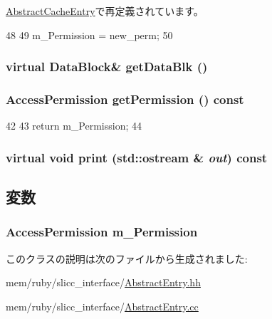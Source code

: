 \hyperlink{classAbstractCacheEntry_ac3f081af818286da737aac954875dd19}{AbstractCacheEntry}で再定義されています。


\begin{DoxyCode}
48 {
49     m_Permission = new_perm;
50 }
\end{DoxyCode}
\hypertarget{classAbstractEntry_afec4a5462c59a6427dd945c8e57d892f}{
\subsubsection[{getDataBlk}]{\setlength{\rightskip}{0pt plus 5cm}virtual {\bf DataBlock}\& getDataBlk ()}}
\label{classAbstractEntry_afec4a5462c59a6427dd945c8e57d892f}
\hypertarget{classAbstractEntry_aaa8d971d0265aff3209ae487837576f7}{
\subsubsection[{getPermission}]{\setlength{\rightskip}{0pt plus 5cm}AccessPermission getPermission () const}}
\label{classAbstractEntry_aaa8d971d0265aff3209ae487837576f7}



\begin{DoxyCode}
42 {
43     return m_Permission;
44 }
\end{DoxyCode}
\hypertarget{classAbstractEntry_a3ea5f7af5db62cc24f4e40df9ea5c971}{
\subsubsection[{print}]{\setlength{\rightskip}{0pt plus 5cm}virtual void print (std::ostream \& {\em out}) const}}
\label{classAbstractEntry_a3ea5f7af5db62cc24f4e40df9ea5c971}


\subsection{変数}
\hypertarget{classAbstractEntry_adffb6e818a8b13110daeb2c3c13fcc50}{
\subsubsection[{m\_\-Permission}]{\setlength{\rightskip}{0pt plus 5cm}AccessPermission {\bf m\_\-Permission}}}
\label{classAbstractEntry_adffb6e818a8b13110daeb2c3c13fcc50}


このクラスの説明は次のファイルから生成されました:\begin{DoxyCompactItemize}
\item 
mem/ruby/slicc\_\-interface/\hyperlink{AbstractEntry_8hh}{AbstractEntry.hh}\item 
mem/ruby/slicc\_\-interface/\hyperlink{AbstractEntry_8cc}{AbstractEntry.cc}\end{DoxyCompactItemize}
